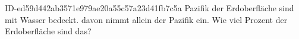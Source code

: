 \begin{exercise}
      {ID-ed59d442ab3571e979ae20a55c57a23d41fb7c5a}
      {Pazifik}
  \ifproblem\problem
     der Erdoberfläche sind mit Wasser bedeckt.  davon nimmt allein der
    Pazifik ein. Wie viel Prozent der Erdoberfläche sind das?
  \fi
\end{exercise}
